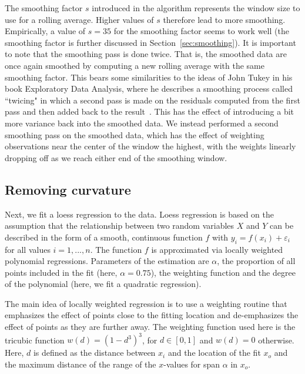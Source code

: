 \documentclass[aoas, preprint]{imsart}\usepackage[]{graphicx}\usepackage[]{color}
\newcommand{\hh}[1]{{\color{magenta} #1}}
\begin{document}
The smoothing factor $s$ introduced in the algorithm represents the window size to use for a rolling average. Higher values of $s$ therefore lead to more smoothing. Empirically, a value of $s = 35$ for the smoothing factor seems to work well (the smoothing factor is further discussed in Section~\ref{sec:smoothing}). It is important to note that the smoothing pass is done twice. That is, the smoothed data are once again smoothed by computing a new rolling average with the same smoothing factor. This bears some similarities to the ideas of John Tukey in his book Exploratory Data Analysis, where he describes a smoothing process called ``twicing" in which a second pass is made on the residuals computed from the first pass and then added back to the result~\citep{tukey:1977}. This has the effect of introducing a bit more variance back into the smoothed data. 
We instead performed a second smoothing pass on the smoothed data, which has the effect of weighting observations near the center of the window the highest, with the weights linearly dropping off as we reach either end of the smoothing window.

\subsection{Removing curvature}
Next, we fit a loess regression to the data. Loess regression \citep{cleveland:1979} is based on the assumption that the relationship between two random variables $X$ and $Y$ can be described in the form of a smooth, continuous function $f$ with $y_i = f(x_i) + \varepsilon_i$ for all values $i = 1, ..., n$. The function $f$ is approximated via locally weighted polynomial regressions. Parameters of the estimation are $\alpha$, the proportion of all points included in the fit (here, $\alpha = 0.75$), the weighting function and the degree of the polynomial (here, we fit a quadratic regression). 

The main idea of locally weighted regression is to use a weighting routine that  emphasizes the effect of points close to the fitting location and de-emphasizes the effect of points as they are further away. The weighting function used here is the tricubic function $w(d) = \left(1 - d^3\right)^3$, for $d \in [0,1]$ and $w(d) = 0$ otherwise. Here, $d$ is defined as the distance between $x_i$ and the location of the fit $x_o$ and the maximum distance of the range of the $x$-values for span $\alpha$ in $x_o$. 

\end{document}
